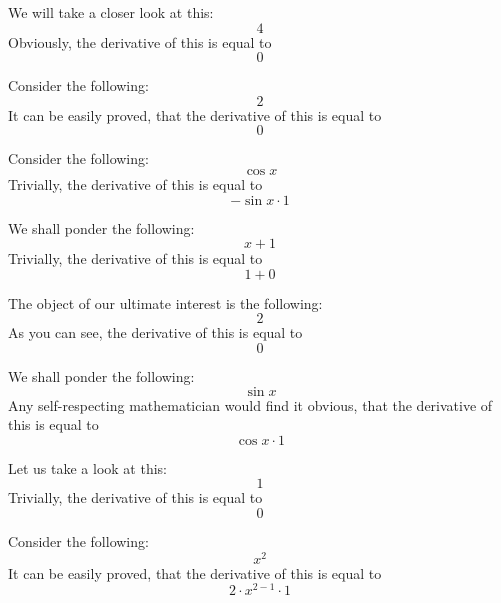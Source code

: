 \documentclass{article}
\begin{document}
We will take a closer look at this:
\begin{equation}
4 
\end{equation}
Obviously, the derivative of this is equal to
\begin{equation}
0 
\end{equation}

Consider the following:
\begin{equation}
2 
\end{equation}
It can be easily proved, that the derivative of this is equal to
\begin{equation}
0 
\end{equation}

Consider the following:
\begin{equation}
\cos x 
\end{equation}
Trivially, the derivative of this is equal to
\begin{equation}
-\sin x \cdot 1 
\end{equation}

We shall ponder the following:
\begin{equation}
x + 1 
\end{equation}
Trivially, the derivative of this is equal to
\begin{equation}
1 + 0 
\end{equation}

The object of our ultimate interest is the following:
\begin{equation}
2 
\end{equation}
As you can see, the derivative of this is equal to
\begin{equation}
0 
\end{equation}

We shall ponder the following:
\begin{equation}
\sin x 
\end{equation}
Any self-respecting mathematician would find it obvious, that the derivative of this is equal to
\begin{equation}
\cos x \cdot 1 
\end{equation}

Let us take a look at this:
\begin{equation}
1 
\end{equation}
Trivially, the derivative of this is equal to
\begin{equation}
0 
\end{equation}

Consider the following:
\begin{equation}
x ^{2 } 
\end{equation}
It can be easily proved, that the derivative of this is equal to
\begin{equation}
2 \cdot x ^{2 - 1 } \cdot 1 
\end{equation}
\end{document}
